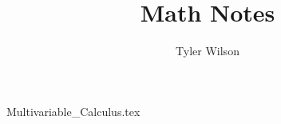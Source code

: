 \documentclass[11pt, fleqn]{article}
\title{Math Notes}
\author{Tyler Wilson}
\date{}
\begin{document}
\allowdisplaybreaks

\maketitle
\tableofcontents

{Multivariable_Calculus.tex}
\end{document}
